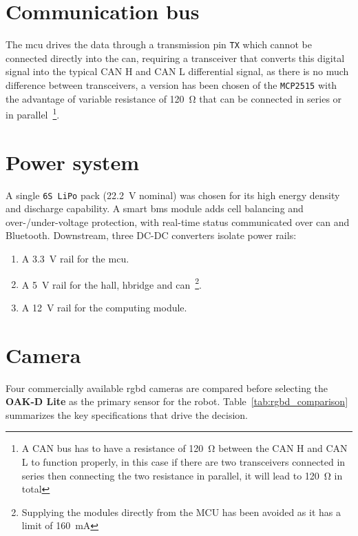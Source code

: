 \section{Communication bus}

The \gls{mcu} drives the data through a transmission pin \texttt{TX} which cannot be connected directly into the \gls{can}, requiring a transceiver that converts this digital signal into the typical CAN H and CAN L differential signal, as there is no much difference between transceivers, a version has been chosen of the \texttt{MCP2515} with the advantage of variable resistance of \SI{120}{\ohm} that can be connected in series or in parallel~\footnote{A CAN bus has to have a resistance of \SI{120}{\ohm} between the CAN H and CAN L to function properly, in this case if there are two transceivers connected in series then connecting the two resistance in parallel, it will lead to \SI{120}{\ohm} in total}.

\section{Power system}\label{sec:power}

A single \texttt{6S LiPo} pack (\SI{22.2}{\volt} nominal) was chosen for its high energy density and discharge capability. A smart \gls{bms} module adds cell balancing and over-/under-voltage protection, with real-time status communicated over \gls{can} and Bluetooth. Downstream, three DC-DC converters isolate power rails:
\begin{enumerate}
  \item A \SI{3.3}{\volt} rail for the \gls{mcu}.

  \item A \SI{5}{\volt} rail for the \gls{hall}, \gls{hbridge} and \gls{can}~\footnote{Supplying the modules directly from the MCU has been avoided as it has a limit of \SI{160}{\milli\ampere}}.

  \item A \SI{12}{\volt} rail for the computing module.
\end{enumerate}

\section{Camera}

Four commercially available \gls{rgbd} cameras are compared before selecting the \textbf{OAK-D Lite} as the primary sensor for the robot.
Table~\ref{tab:rgbd_comparison} summarizes the key specifications that drive the decision.

